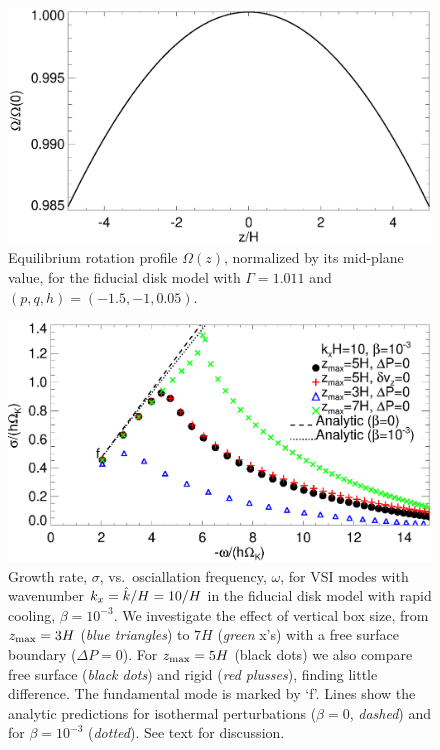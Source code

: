 \begin{figure}
  \includegraphics[width=\linewidth,clip=true,trim=0cm 0cm 0cm
  0cm]{figures/omega2} 
  \caption{Equilibrium rotation profile $\Omega(z)$,
    normalized by its mid-plane value, for  the fiducial disk model with $\Gamma=1.011$
    and $(p,q, h)=(-1.5,-1,0.05)$. 
    \label{omega_z} 
  }
\end{figure}

\begin{figure}
  \includegraphics[width=\linewidth]{figures/compare_modes_iso_kx10_analytic.ps}
  \caption{Growth rate, $\sigma$, vs.\ osciallation frequency, $\omega$, for
  VSI modes with wavenumber $k_x = \hat{k}/H=10/H$ in the fiducial disk model
    with rapid cooling, $\beta=10^{-3}$. %
We investigate the effect of vertical box size, from $z_\mathrm{max}=3H$
(\emph{blue triangles}) to $7H$ (\emph{green} x's)
    with a free surface boundary ($\Delta P=0$).  For $z_\mathrm{max}=5H$  (black dots) we also compare free surface (\emph{black dots}) and rigid (\emph{red plusses}), finding little difference.
      The fundamental mode is marked by `f'. Lines show the analytic predictions for
      isothermal perturbations ($\beta = 0$, \emph{dashed}) and for $\beta = 10^{-3}$ (\emph{dotted}).
      See text for discussion.
    \label{compare_modes_iso_kx10} 
  }
\end{figure}


